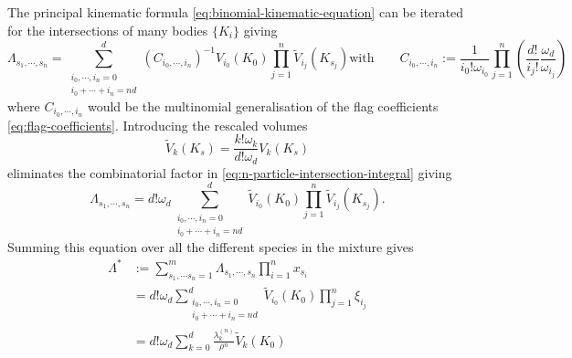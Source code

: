 \documentclass[11pt,twoside]{report}
\begin{document}
The principal kinematic formula \eqref{eq:binomial-kinematic-equation} can be iterated for the intersections of many bodies $\{K_i\}$ giving \cite{Santalo2004,MarechalPRE2014}
\begin{subequations}\label{eq:multinomial-kinematic-equation}
  \begin{equation}
    \Lambda_{s_1, \cdots, s_n}
    =
      \sum_{\substack{i_0, \cdots, i_n = 0 \\ i_0 + \cdots + i_n = nd}}^d
      (C_{i_0, \cdots, i_n})^{-1}
      V_{i_0}(K_0)
      \prod_{j=1}^n
      \widetilde{V}_{i_j}(K_{s_j})
  \end{equation}
  \begin{equation}
    \textrm{with} \qquad
    C_{i_0, \cdots, i_n}
    := \frac{1}{i_0! \omega_{i_0}}
    \prod_{j=1}^n
    \left(
    \frac{d!}{i_j!} \frac{\omega_d}{\omega_{i_j}}
    \right)
  \end{equation}
\end{subequations}
where $C_{i_0, \cdots, i_n}$ would be the multinomial generalisation of the flag coefficients \eqref{eq:flag-coefficients}.
Introducing the rescaled volumes
\begin{equation}\label{eq:rescaled-intrinsic-volumes}
  \widetilde{V}_k(K_s)
  =
  \frac{k! \omega_k}{d! \omega_d} V_k(K_s)
\end{equation}
eliminates the combinatorial factor in \eqref{eq:n-particle-intersection-integral} giving
\begin{equation}\label{eq:lambda-reduced}
  \Lambda_{s_1, \cdots, s_n}
  =
  d! \omega_d
  \sum_{\substack{i_0, \cdots, i_n = 0 \\ i_0 + \cdots + i_n = nd}}^d
  \widetilde{V}_{i_0}(K_0)
  \prod_{j=1}^n
  \widetilde{V}_{i_j}(K_{s_j}).
\end{equation}
Summing this equation over all the different species in the mixture gives
\begin{equation}
  \label{eq:final-lambda}
  \begin{split}
    \Lambda^*
    & :=
    \sum_{s_1, \cdots s_n = 1}^m
    \Lambda_{s_1, \cdots, s_n}
    \prod_{i=1}^n x_{s_i}
    \\ &=
    d! \omega_d
    \sum_{\substack{i_0, \cdots, i_n = 0 \\ i_0 + \cdots + i_n = nd}}^d
    \widetilde{V}_{i_0}(K_0)
    \prod_{j=1}^n
    \xi_{i_j}
    \\ &=
    d! \omega_d
    \sum_{k = 0}^d
    \frac{\lambda_k^{(n)}}{\rho^n}
    \widetilde{V}_{k}(K_0)
  \end{split}
\end{equation}
\end{document}
